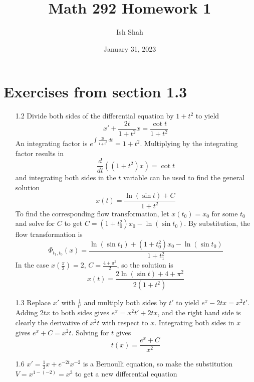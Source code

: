 \documentclass{exam}
\title{Math 292 Homework 1}
\author{Ish Shah}
\date{January 31, 2023}
\begin{document}
\maketitle

\section{Exercises from section 1.3}
\begin{enumerate}
    \item[1.2] Divide both sides of the differential equation by $1+t^2$ to yield
    \begin{equation*}
        x' + \frac{2t}{1+t^2}x = \frac{\cot t}{1+t^2}
    \end{equation*}
    An integrating factor is $\displaystyle e^{\int \frac{2t}{1+t^2}\,dt} = 1+t^2$. Multiplying by the integrating factor results in
    \begin{equation*}
        \frac{d}{dt}\left(\left(1+t^2\right)x\right) = \cot t
    \end{equation*}
    and integrating both sides in the $t$ variable can be used to find the general solution
    \begin{equation*}
        x(t) = \frac{\ln(\sin t) + C}{1+t^2}
    \end{equation*}
    To find the corresponding flow transformation, let $x(t_0) = x_0$ for some $t_0$ and solve for $C$ to get $C = \left(1+t_0^2\right)x_0-\ln(\sin t_0)$. By substitution, the flow transformation is
    \begin{equation*}
        \Phi_{t_1,t_0}(x) = \frac{\ln(\sin t_1) + \left(1+t_0^2\right)x_0-\ln(\sin t_0)}{1+t_1^2}
    \end{equation*}
    In the case $\displaystyle x\left(\frac{\pi}{2}\right) = 2$, $C = \frac{4+\pi^2}{2}$, so the solution is
    \begin{equation*}
        x(t) = \frac{2\ln(\sin t)+4+\pi^2}{2\left(1+t^2\right)}
    \end{equation*}
    \item[1.3] Replace $x'$ with $\frac{1}{t'}$ and multiply both sides by $t'$ to yield $e^x-2tx=x^2t'$. Adding $2tx$ to both sides gives $e^x = x^2t' + 2tx$, and the right hand side is clearly the derivative of $x^2t$ with respect to $x$. Integrating both sides in $x$ gives $e^x + C  =x^2t$. Solving for $t$ gives
    \begin{equation*}
        t(x) = \frac{e^x + C}{x^2}
    \end{equation*}
    \item[1.6] $x' = \frac{1}{3}x + e^{-2t}x^{-2}$ is a Bernoulli equation, so make the substitution $V = x^{1-(-2)} = x^3$ to get a new differential equation

\end{enumerate}
\end{document}
